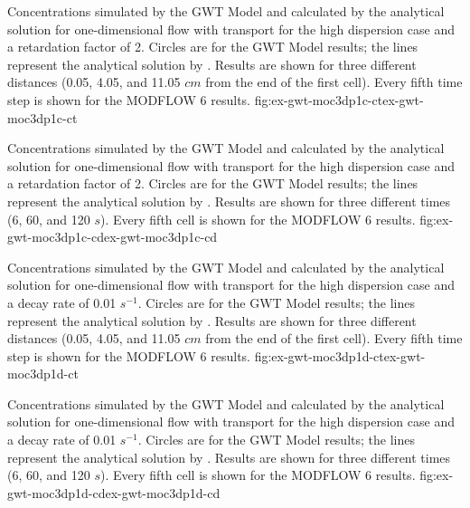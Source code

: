 \begin{StandardFigure}{
                                     Concentrations simulated by the \mf GWT Model and calculated by the analytical solution for one-dimensional flow with transport for the high dispersion case and a retardation factor of 2.  Circles are for the GWT Model results; the lines represent the analytical solution by \cite{wexler1992}.  Results are shown for three different distances (0.05, 4.05, and 11.05 $cm$ from the end of the first cell).  Every fifth time step is shown for the MODFLOW 6 results.
                                     }{fig:ex-gwt-moc3dp1c-ct}{ex-gwt-moc3dp1c-ct}
\end{StandardFigure}            

\begin{StandardFigure}{
                                     Concentrations simulated by the \mf GWT Model and calculated by the analytical solution for one-dimensional flow with transport for the high dispersion case and a retardation factor of 2.  Circles are for the GWT Model results; the lines represent the analytical solution by \cite{wexler1992}.  Results are shown for three different times (6, 60, and 120 $s$).  Every fifth cell is shown for the MODFLOW 6 results.
                                     }{fig:ex-gwt-moc3dp1c-cd}{ex-gwt-moc3dp1c-cd}
\end{StandardFigure}            

\begin{StandardFigure}{
                                     Concentrations simulated by the \mf GWT Model and calculated by the analytical solution for one-dimensional flow with transport for the high dispersion case and a decay rate of 0.01 $s^{-1}$.  Circles are for the GWT Model results; the lines represent the analytical solution by \cite{wexler1992}.  Results are shown for three different distances (0.05, 4.05, and 11.05 $cm$ from the end of the first cell).  Every fifth time step is shown for the MODFLOW 6 results.
                                     }{fig:ex-gwt-moc3dp1d-ct}{ex-gwt-moc3dp1d-ct}
\end{StandardFigure}            

\begin{StandardFigure}{
                                     Concentrations simulated by the \mf GWT Model and calculated by the analytical solution for one-dimensional flow with transport for the high dispersion case and a decay rate of 0.01 $s^{-1}$.  Circles are for the GWT Model results; the lines represent the analytical solution by \cite{wexler1992}.  Results are shown for three different times (6, 60, and 120 $s$).  Every fifth cell is shown for the MODFLOW 6 results.
                                     }{fig:ex-gwt-moc3dp1d-cd}{ex-gwt-moc3dp1d-cd}
\end{StandardFigure}            

